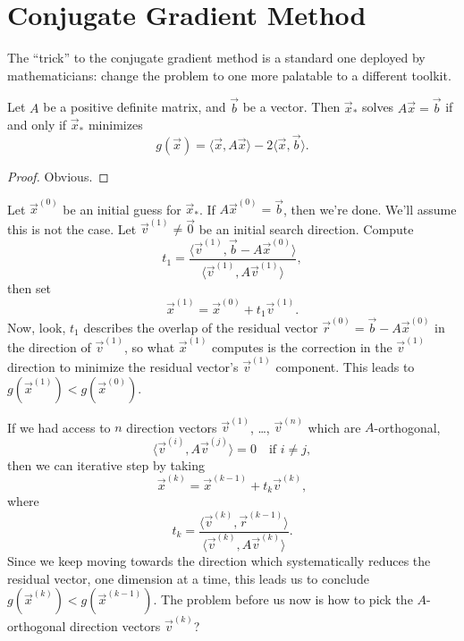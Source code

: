 \section{Conjugate Gradient Method}

The ``trick'' to the conjugate gradient method is a standard one
deployed by mathematicians: change the problem to one more palatable to
a different toolkit.

\begin{theorem}
Let $A$ be a positive definite matrix, and $\vec{b}$ be a vector.
Then $\vec{x}_{*}$ solves $A\vec{x}=\vec{b}$ if and only if
$\vec{x}_{*}$ minimizes
\begin{equation}
g(\vec{x})=\langle\vec{x},A\vec{x}\rangle-2\langle\vec{x},\vec{b}\rangle.
\end{equation}
\end{theorem}

\begin{proof}
Obvious.
\end{proof}

Let $\vec{x}^{(0)}$ be an initial guess for $\vec{x}_{*}$. If
$A\vec{x}^{(0)}=\vec{b}$, then we're done. We'll assume this is not the
case. Let
$\vec{v}^{(1)}\neq\vec{0}$ be an initial search direction. Compute
\begin{equation}
t_{1} = \frac{\langle\vec{v}^{(1)},\vec{b}-A\vec{x}^{(0)}\rangle}{\langle\vec{v}^{(1)},A\vec{v}^{(1)}\rangle},
\end{equation}
then set
\begin{equation}
\vec{x}^{(1)} = \vec{x}^{(0)}+t_{1}\vec{v}^{(1)}.
\end{equation}
Now, look, $t_{1}$ describes the overlap of the residual vector
$\vec{r}^{(0)}=\vec{b}-A\vec{x}^{(0)}$ in the direction of
$\vec{v}^{(1)}$, so what $\vec{x}^{(1)}$ computes is the correction in
the $\vec{v}^{(1)}$ direction to minimize the residual vector's
$\vec{v}^{(1)}$ component. This leads to
$g(\vec{x}^{(1)})<g(\vec{x}^{(0)})$.

If we had access to $n$ direction vectors $\vec{v}^{(1)}$, \dots,
$\vec{v}^{(n)}$ which are $A$-orthogonal,
\begin{equation}
\langle\vec{v}^{(i)},A\vec{v}^{(j)}\rangle=0\quad\mbox{if }i\neq j,
\end{equation}
then we can iterative step by taking
\begin{equation}
\vec{x}^{(k)} = \vec{x}^{(k-1)} + t_{k}\vec{v}^{(k)},
\end{equation}
where
\begin{equation}
t_{k} = \frac{\langle\vec{v}^{(k)},\vec{r}^{(k-1)}\rangle}{\langle\vec{v}^{(k)},A\vec{v}^{(k)}\rangle}.
\end{equation}
Since we keep moving towards the direction which systematically reduces
the residual vector, one dimension at a time, this leads us to conclude
$g(\vec{x}^{(k)})<g(\vec{x}^{(k-1)})$. 
The problem before us now is how to pick the $A$-orthogonal direction
vectors $\vec{v}^{(k)}$?

